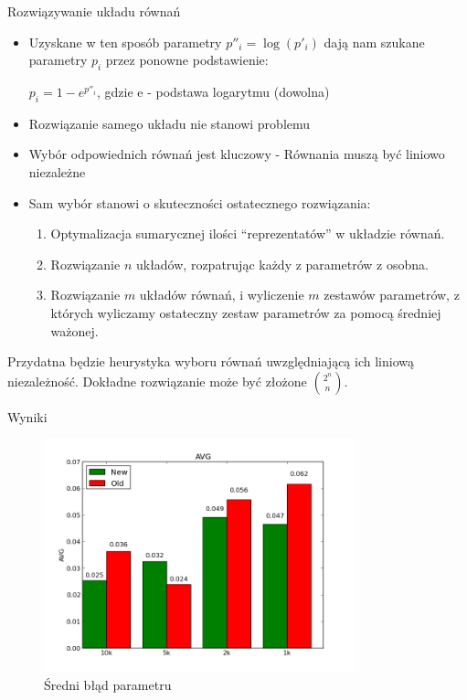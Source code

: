 \documentclass{beamer}
\begin{document}
\begin{frame}{Rozwiązywanie układu równań}
	\begin{itemize}
		\item Uzyskane w ten sposób parametry $p''_i = \log{(p'_i)}$ dają nam szukane parametry $p_i$ przez ponowne podstawienie: 

		$p_i = 1 - e^{p''_i}$, gdzie e - podstawa logarytmu (dowolna)

		\item Rozwiązanie samego układu nie stanowi problemu
		\item Wybór odpowiednich równań jest kluczowy - Równania muszą być liniowo niezależne
		\item Sam wybór stanowi o skuteczności ostatecznego rozwiązania:
		\begin{enumerate}
			\item Optymalizacja sumarycznej ilości ``reprezentatów'' w układzie równań. 
			\item Rozwiązanie $n$ układów, rozpatrując każdy z parametrów z osobna.
			\item Rozwiązanie $m$ układów równań, i wyliczenie $m$ zestawów parametrów, z których wyliczamy ostateczny zestaw parametrów za pomocą średniej ważonej.
		\end{enumerate}
	\end{itemize}
	Przydatna będzie heurystyka wyboru równań uwzględniającą ich liniową niezależność. Dokładne rozwiązanie może być złożone ${2^n \choose n}$.
\end{frame}

\begin{frame}{Wyniki}
	\begin{figure}[h!]
		\centering
		\includegraphics[width=9cm]{avg.png}
		\caption{Średni błąd parametru}
	\end{figure}
\end{frame}
\end{document}
